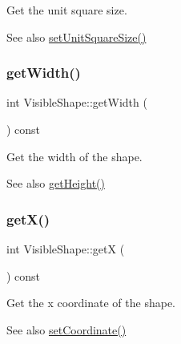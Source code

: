 Get the unit square size. 

\begin{DoxySeeAlso}{See also}
\mbox{\hyperlink{class_visible_shape_a52308c3c9134514fb6782c6f0e149914}{set\+Unit\+Square\+Size()}} 
\end{DoxySeeAlso}
\mbox{\label{class_visible_shape_a667b81608efd869c907bd342397f3eb5}} 
\subsubsection{\texorpdfstring{get\+Width()}{getWidth()}}
{\footnotesize\ttfamily int Visible\+Shape\+::get\+Width (\begin{DoxyParamCaption}{ }\end{DoxyParamCaption}) const\hspace{0.3cm}{\ttfamily [virtual]}}



Get the width of the shape. 

\begin{DoxySeeAlso}{See also}
\mbox{\hyperlink{class_visible_shape_a1ce25935c729146932d649f88215ffbe}{get\+Height()}} 
\end{DoxySeeAlso}
\mbox{\label{class_visible_shape_a623ee2bd2e408da908ec5b210347b36e}} 
\subsubsection{\texorpdfstring{get\+X()}{getX()}}
{\footnotesize\ttfamily int Visible\+Shape\+::getX (\begin{DoxyParamCaption}{ }\end{DoxyParamCaption}) const\hspace{0.3cm}{\ttfamily [virtual]}}



Get the x coordinate of the shape. 

\begin{DoxySeeAlso}{See also}
\mbox{\hyperlink{class_visible_shape_a350f7faac22e405df7c4012fe9d03fac}{set\+Coordinate()}} 
\end{DoxySeeAlso}
\mbox{\label{class_visible_shape_ace747d31bf685044d815b6fa1944055e}} 
